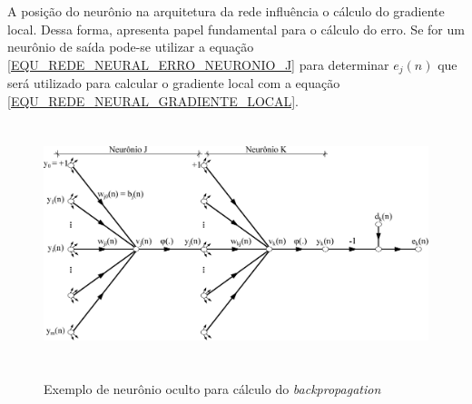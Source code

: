 A posição do neurônio na arquitetura da rede influência o cálculo do gradiente local. Dessa forma, apresenta papel fundamental para o cálculo do erro. Se for um neurônio de saída pode-se utilizar a equação \eqref{EQU_REDE_NEURAL_ERRO_NEURONIO_J} para determinar \(e_{j}(n)\) que será utilizado para calcular o gradiente local com a equação \eqref{EQU_REDE_NEURAL_GRADIENTE_LOCAL}.
\begin{figure}[hbt]
	\centering
 	  \caption{Exemplo de neurônio oculto para cálculo do \emph{backpropagation}}
		\includegraphics[width=13cm,height=7cm]{./secoes/conceitosFundamentais/pics/img/doisNeuronios.eps}
	\label{FIGURA_REDE_NEURAL_NEURONIOS_BACKPROPAGATION}
\end{figure}

